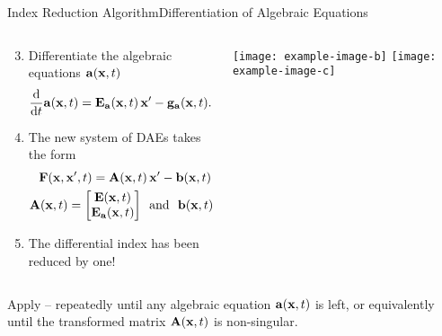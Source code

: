 \begin{frame}{Index Reduction Algorithm}{Differentiation of Algebraic Equations}
  \begin{columns}
    \begin{column}[c]{0.6\textwidth}
      \begin{enumerate}[<+->]\setcounter{enumi}{2}
        \item Differentiate the algebraic equations $\mathbf{a}(\mathbf{x}, t)$
        \begin{equation*}
          \dfrac{\text{d}}{\text{d}t} \mathbf{a}(\mathbf{x}, t) = \mathbf{E}_{\mathbf{a}}(\mathbf{x}, t) \, \mathbf{x}^\prime - \mathbf{g}_{\mathbf{a}}(\mathbf{x}, t) \text{.}
        \end{equation*}
        \item The new system of \acp{DAE} takes the form
        \begin{align*}
          \mathbf{F}(\mathbf{x}, \mathbf{x}^\prime, t) = \mathbf{A}(\mathbf{x}, t) \, &\mathbf{x}^\prime - \mathbf{b}(\mathbf{x}, t) = \mathbf{0} ~~ \text{with} \\
          \mathbf{A}(\mathbf{x}, t) = \begin{bmatrix} \mathbf{E}(\mathbf{x}, t) \\ \mathbf{E}_{\mathbf{a}}(\mathbf{x}, t) \end{bmatrix}
          ~~ &\text{and} ~~
          \mathbf{b}(\mathbf{x}, t) = \begin{bmatrix} \mathbf{g}(\mathbf{x}, t) \\ \mathbf{g}_{\mathbf{a}}(\mathbf{x}, t) \end{bmatrix} \text{.}
        \end{align*}
        \item The differential index has been reduced by one!
      \end{enumerate}
    \end{column}
    \begin{column}[c]{0.4\textwidth}
      \texttt{[image: example-image-b]}
      \texttt{[image: example-image-c]}
    \end{column}
  \end{columns}
  \begin{bbox}
    Apply -- repeatedly until any algebraic equation $\mathbf{a}(\mathbf{x}, t)$ is left, or equivalently until the transformed matrix $\mathbf{A}(\mathbf{x}, t)$ is non-singular.
  \end{bbox}
\end{frame}

